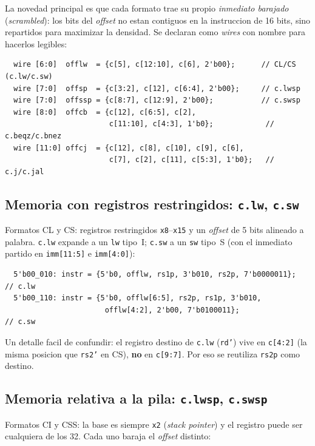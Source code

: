 \documentclass[11pt,a4paper]{article}
\begin{document}
La novedad principal es que cada formato trae su propio \emph{inmediato
barajado} (\textit{scrambled}): los bits del \textit{offset} no estan
contiguos en la instruccion de 16 bits, sino repartidos para maximizar la
densidad. Se declaran como \textit{wires} con nombre para hacerlos legibles:

\begin{lstlisting}
  wire [6:0]  offlw  = {c[5], c[12:10], c[6], 2'b00};      // CL/CS (c.lw/c.sw)
  wire [7:0]  offsp  = {c[3:2], c[12], c[6:4], 2'b00};     // c.lwsp
  wire [7:0]  offssp = {c[8:7], c[12:9], 2'b00};           // c.swsp
  wire [8:0]  offcb  = {c[12], c[6:5], c[2],
                        c[11:10], c[4:3], 1'b0};            // c.beqz/c.bnez
  wire [11:0] offcj  = {c[12], c[8], c[10], c[9], c[6],
                        c[7], c[2], c[11], c[5:3], 1'b0};   // c.j/c.jal
\end{lstlisting}

\subsection{Memoria con registros restringidos: \texttt{c.lw}, \texttt{c.sw}}

Formatos CL y CS: registros restringidos \texttt{x8}--\texttt{x15} y un
\textit{offset} de 5 bits alineado a palabra. \texttt{c.lw} expande a un
\texttt{lw} tipo~I; \texttt{c.sw} a un \texttt{sw} tipo~S (con el inmediato
partido en \texttt{imm[11:5]} e \texttt{imm[4:0]}):

\begin{lstlisting}
  5'b00_010: instr = {5'b0, offlw, rs1p, 3'b010, rs2p, 7'b0000011};   // c.lw
  5'b00_110: instr = {5'b0, offlw[6:5], rs2p, rs1p, 3'b010,
                       offlw[4:2], 2'b00, 7'b0100011};                // c.sw
\end{lstlisting}

Un detalle facil de confundir: el registro destino de \texttt{c.lw}
(\texttt{rd'}) vive en \texttt{c[4:2]} (la misma posicion que \texttt{rs2'} en
CS), \textbf{no} en \texttt{c[9:7]}. Por eso se reutiliza \texttt{rs2p} como
destino.

\subsection{Memoria relativa a la pila: \texttt{c.lwsp}, \texttt{c.swsp}}

Formatos CI y CSS: la base es siempre \texttt{x2} (\textit{stack pointer}) y el
registro puede ser cualquiera de los 32. Cada uno baraja el \textit{offset}
distinto:
\end{document}
